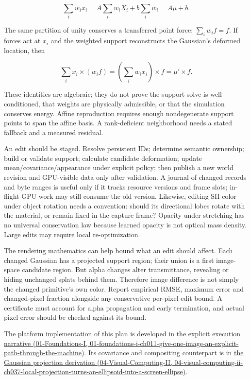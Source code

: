 \[
\sum_iw_ix_i=A\sum_iw_iX_i+b\sum_iw_i=A\mu+b.
\]

The same partition of unity conserves a transferred point force: \(\sum_iw_if=f\). If forces act at \(x_i\) and the weighted support reconstructs the Gaussian's deformed location, then

\[
\sum_ix_i\times(w_if)=\left(\sum_iw_ix_i\right)\times f=\mu'\times f.
\]

These identities are algebraic; they do not prove the support solve is well-conditioned, that weights are physically admissible, or that the simulation conserves energy. Affine reproduction requires enough nondegenerate support points to span the affine basis. A rank-deficient neighborhood needs a stated fallback and a measured residual.

An edit should be staged. Resolve persistent IDs; determine semantic ownership; build or validate support; calculate candidate deformation; update mean/covariance/appearance under explicit policy; then publish a new world revision and GPU-visible data only after validation. A journal of changed records and byte ranges is useful only if it tracks resource versions and frame slots; in-flight GPU work may still consume the old version. Likewise, editing SH color under object rotation needs a convention: should its directional lobes rotate with the material, or remain fixed in the capture frame? Opacity under stretching has no universal conservation law because learned opacity is not optical mass density. Large edits may require local re-optimization.

The rendering mathematics can help bound what an edit should affect. Each changed Gaussian has a projected support region; their union is a first image-space candidate region. But alpha changes alter transmittance, revealing or hiding unchanged splats behind them. Therefore image difference is not simply the changed primitive's own color. Report empirical RMSE, maximum error and changed-pixel fraction alongside any conservative per-pixel edit bound. A certificate must account for alpha propagation and early termination, and actual pixel error should be checked against its bound.

The platform implementation of this plan is developed in \href{../01-Foundations-I/main.pdf\#nameddest=01-foundations-i-ch011-give-one-image-an-explicit-path-through-the-machine}{the explicit execution narrative (01-Foundations-I, 01-foundations-i-ch011-give-one-image-an-explicit-path-through-the-machine)}. Its covariance and compositing counterpart is in \href{../04-Visual-Computing-II/main.pdf\#nameddest=04-visual-computing-ii-ch037-local-projection-turns-an-ellipsoid-into-a-screen-ellipse}{the Gaussian projection derivation (04-Visual-Computing-II, 04-visual-computing-ii-ch037-local-projection-turns-an-ellipsoid-into-a-screen-ellipse)}.

